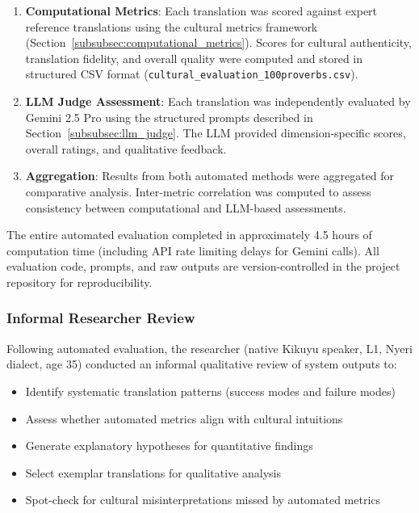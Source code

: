 \begin{enumerate}
    \item \textbf{Computational Metrics}: Each translation was scored against expert reference translations using the cultural metrics framework (Section~\ref{subsubsec:computational_metrics}). Scores for cultural authenticity, translation fidelity, and overall quality were computed and stored in structured CSV format (\texttt{cultural\_evaluation\_100proverbs.csv}).
    
    \item \textbf{LLM Judge Assessment}: Each translation was independently evaluated by Gemini 2.5 Pro using the structured prompts described in Section~\ref{subsubsec:llm_judge}. The LLM provided dimension-specific scores, overall ratings, and qualitative feedback.
    
    \item \textbf{Aggregation}: Results from both automated methods were aggregated for comparative analysis. Inter-metric correlation was computed to assess consistency between computational and LLM-based assessments.
\end{enumerate}

The entire automated evaluation completed in approximately 4.5 hours of computation time (including API rate limiting delays for Gemini calls). All evaluation code, prompts, and raw outputs are version-controlled in the project repository for reproducibility.

\subsubsection{Informal Researcher Review}
\label{subsubsec:researcher_review}

Following automated evaluation, the researcher (native Kikuyu speaker, L1, Nyeri dialect, age 35) conducted an informal qualitative review of system outputs to:

\begin{itemize}
    \item Identify systematic translation patterns (success modes and failure modes)
    \item Assess whether automated metrics align with cultural intuitions
    \item Generate explanatory hypotheses for quantitative findings
    \item Select exemplar translations for qualitative analysis
    \item Spot-check for cultural misinterpretations missed by automated metrics
\end{itemize}

